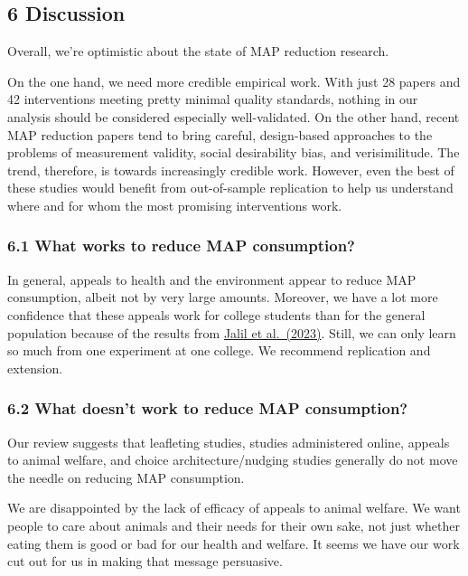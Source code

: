\documentclass[
  letterpaper,
  DIV=11,
  numbers=noendperiod]{scrartcl}
\begin{document}
\hypertarget{discussion}{%
\subsection{6 Discussion}\label{discussion}}

Overall, we're optimistic about the state of MAP reduction research.

On the one hand, we need more credible empirical work. With just 28
papers and 42 interventions meeting pretty minimal quality standards,
nothing in our analysis should be considered especially well-validated.
On the other hand, recent MAP reduction papers tend to bring careful,
design-based approaches to the problems of measurement validity, social
desirability bias, and verisimilitude. The trend, therefore, is towards
increasingly credible work. However, even the best of these studies
would benefit from out-of-sample replication to help us understand where
and for whom the most promising interventions work.

\hypertarget{what-works-to-reduce-map-consumption}{%
\subsubsection{6.1 What works to reduce MAP
consumption?}\label{what-works-to-reduce-map-consumption}}

In general, appeals to health and the environment appear to reduce MAP
consumption, albeit not by very large amounts. Moreover, we have a lot
more confidence that these appeals work for college students than for
the general population because of the results from
\href{https://doi.org/10.1038/s43016-023-00712-1}{Jalil et al.~(2023)}.
Still, we can only learn so much from one experiment at one college. We
recommend replication and extension.

\hypertarget{what-doesnt-work-to-reduce-map-consumption}{%
\subsubsection{6.2 What doesn't work to reduce MAP
consumption?}\label{what-doesnt-work-to-reduce-map-consumption}}

Our review suggests that leafleting studies, studies administered
online, appeals to animal welfare, and choice architecture/nudging
studies generally do not move the needle on reducing MAP consumption.

We are disappointed by the lack of efficacy of appeals to animal
welfare. We want people to care about animals and their needs for their
own sake, not just whether eating them is good or bad for our health and
welfare. It seems we have our work cut out for us in making that message
persuasive.
\end{document}
